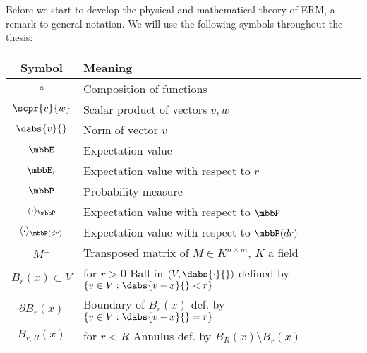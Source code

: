 Before we start to develop the physical and mathematical theory of ERM, a remark to general notation. We will use the following symbols throughout the thesis:
\begin{table}[H]
    \centering
    \begin{tabular}{c|l}
        Symbol & Meaning \\
        \hline\hline
        $\circ$ & Composition of functions \\
        $\scpr{v}{w}$ & Scalar product of vectors $v,w$ \\
        $\dabs{v}{}$ & Norm of vector $v$ \\
        $\mbbE$ & Expectation value \\
        $\mbbE_r$ & Expectation value with respect to $r$ \\
        $\mbbP$ & Probability measure \\
        $\langle \cdot\rangle_{\mbbP}$ & Expectation value with respect to $\mbbP$ \\
        $\langle \cdot\rangle_{\mbbP(dr)}$ & Expectation value with respect to $\mbbP(dr)$ \\
        $M^\bot$ & Transposed matrix of $M\in K^{n\times m}$, $K$ a field \\
        \hline\hline
        $B_r(x)\subset V$ & for $r>0$ Ball in $(V,\dabs{\cdot}{})$ defined by $\{v\in V: \dabs{v-x}{} < r\}$ \\
        $\partial B_r(x)$ & Boundary of $B_r(x)$ def. by $\{v\in V: \dabs{v-x}{} = r\}$ \\
        $B_{r,R}(x)$ & for $r<R$ Annulus def. by $B_R(x)\setminus B_r(x)$ \\
    \end{tabular}
\end{table}